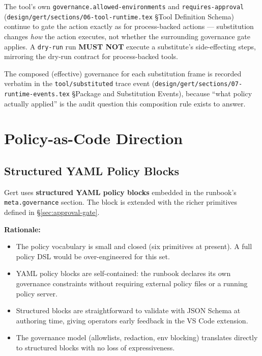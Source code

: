 The tool's own \texttt{governance.allowed-environments} and
\texttt{requires-approval} (\texttt{design/gert/sections/06-tool-runtime.tex}
\S Tool Definition Schema) continue to gate the action exactly as for
process-backed actions --- substitution changes \emph{how} the action
executes, not whether the surrounding governance gate applies. A
\texttt{dry-run} run \textbf{MUST NOT} execute a substitute's side-effecting
steps, mirroring the dry-run contract for process-backed tools.

The composed (effective) governance for each substitution frame is recorded
verbatim in the \texttt{tool/substituted} trace event
(\texttt{design/gert/sections/07-runtime-events.tex}
\S Package and Substitution Events), because ``what policy actually
applied'' is the audit question this composition rule exists to answer.

\section{Policy-as-Code Direction}

\subsection{Structured YAML Policy Blocks}

Gert uses \textbf{structured YAML policy blocks} embedded in the runbook's
\texttt{meta.governance} section. The block is extended with the
richer primitives defined in §\ref{sec:approval-gate}.

\textbf{Rationale:}
\begin{itemize}
  \item The policy vocabulary is small and closed (six primitives at present). A full policy
        DSL would be over-engineered for this set.
  \item YAML policy blocks are self-contained: the runbook declares its own governance
        constraints without requiring external policy files or a running policy server.
  \item Structured blocks are straightforward to validate with JSON Schema at authoring time,
        giving operators early feedback in the VS Code extension.
  \item The governance model (allowlists, redaction, env blocking) translates
        directly to structured blocks with no loss of expressiveness.
\end{itemize}

